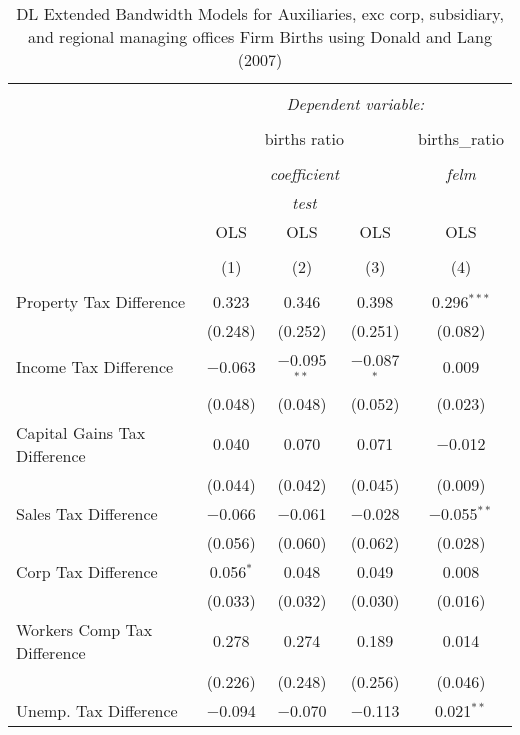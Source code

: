 
\begin{table}[!htbp] \centering 
  \caption{DL Extended Bandwidth Models for  Auxiliaries, exc corp, subsidiary, and regional managing offices Firm Births using Donald and Lang (2007)} 
  \label{} 
\begin{tabular}{@{\extracolsep{5pt}}lcccc} 
\\[-1.8ex]\hline 
\hline \\[-1.8ex] 
 & \multicolumn{4}{c}{\textit{Dependent variable:}} \\ 
\cline{2-5} 
\\[-1.8ex] & \multicolumn{3}{c}{births ratio} & births\_ratio \\ 
\\[-1.8ex] & \multicolumn{3}{c}{\textit{coefficient}} & \textit{felm} \\ 
 & \multicolumn{3}{c}{\textit{test}} & \textit{} \\ 
 & OLS & OLS & OLS & OLS \\ 
\\[-1.8ex] & (1) & (2) & (3) & (4)\\ 
\hline \\[-1.8ex] 
 Property Tax Difference & 0.323 & 0.346 & 0.398 & 0.296$^{***}$ \\ 
  & (0.248) & (0.252) & (0.251) & (0.082) \\ 
  Income Tax Difference & $-$0.063 & $-$0.095$^{**}$ & $-$0.087$^{*}$ & 0.009 \\ 
  & (0.048) & (0.048) & (0.052) & (0.023) \\ 
  Capital Gains Tax Difference & 0.040 & 0.070 & 0.071 & $-$0.012 \\ 
  & (0.044) & (0.042) & (0.045) & (0.009) \\ 
  Sales Tax Difference & $-$0.066 & $-$0.061 & $-$0.028 & $-$0.055$^{**}$ \\ 
  & (0.056) & (0.060) & (0.062) & (0.028) \\ 
  Corp Tax Difference & 0.056$^{*}$ & 0.048 & 0.049 & 0.008 \\ 
  & (0.033) & (0.032) & (0.030) & (0.016) \\ 
  Workers Comp Tax Difference & 0.278 & 0.274 & 0.189 & 0.014 \\ 
  & (0.226) & (0.248) & (0.256) & (0.046) \\ 
  Unemp. Tax Difference & $-$0.094 & $-$0.070 & $-$0.113 & 0.021$^{**}$ \\ 

\end{tabular}
\end{table}
